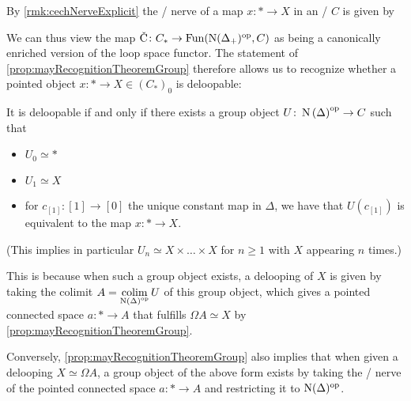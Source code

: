 \begin{remark}
    By \cref{rmk:cechNerveExplicit} the \Cech/ nerve of a map $x\colon*\to X$ in an \inftytop/ $C$ is given by
    \begin{center}
    \end{center}
    We can thus view the map $\CN\colon C_*\to\Fun(\N(\Delta_+)^{\op},C)$ as being a canonically enriched version of the loop space functor.
    The statement of \cref{prop:mayRecognitionTheoremGroup} therefore allows us to recognize whether a pointed object $x\colon*\to X\in\left(C_*\right)_0$ is deloopable:

    It is deloopable if and only if there exists a group object $U\colon\operatorname{N}\left(\Delta\right)^{\operatorname{op}}\to C$ such that 
    \begin{itemize}
        \item $U_0\simeq*$
        \item $U_1\simeq X$
        \item for $c_{[1]}\colon[1]\to[0]$ the unique constant map in $\Delta$, we have that $U(c_{[1]})$ is equivalent to the map $x\colon*\to X$.
    \end{itemize}
    (This implies in particular $U_n\simeq X\times\ldots\times X$ for $n\geq1$ with $X$ appearing $n$ times.)

    This is because when such a group object exists, a delooping of $X$ is given by taking the colimit $A=\operatorname*{colim}\limits_{\operatorname{N}\left(\Delta\right)^{\operatorname{op}}} U$ of this group object, which gives a pointed connected space $a\colon*\to A$ that fulfills $\Omega A\simeq X$ by \cref{prop:mayRecognitionTheoremGroup}.

    Conversely, \cref{prop:mayRecognitionTheoremGroup} also implies that when given a delooping $X\simeq\Omega A$, a group object of the above form exists by taking the \Cech/ nerve of the pointed connected space $a\colon*\to A$ and restricting it to $\operatorname{N}(\Delta)^{\operatorname{op}}$.
\end{remark}
